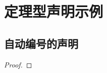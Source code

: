 \chapter{定理型声明示例}
\section{自动编号的声明}
\begin{definition} %
\aaa
\end{definition}%
\begin{proposition} %
\aaa
\end{proposition}%
\begin{theorem}%
 \aaa
\end{theorem}%
\begin{example}%
\aaa
\end{example}
\begin{lemma}%
\aaa
\end{lemma}
\begin{axiom}%
\aaa
\end{axiom}
\begin{corollary}%
\aaa
\end{corollary}
\begin{exercise}%
\aaa
\end{exercise}
\begin{proof}%
\aaa
\end{proof}
